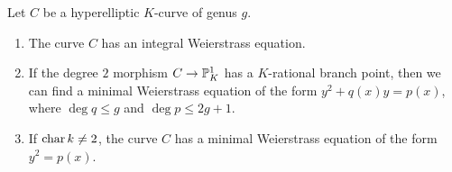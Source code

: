 \begin{prop}\label{algo}
 Let $C$ be a hyperelliptic $K$-curve of genus $g$. 
 \begin{enumerate}[\upshape(a)]
  \item The curve $C$ has an integral Weierstrass equation.  
  \item If the degree $2$ morphism $C \rightarrow \P^1_K$ has a $K$-rational branch point, then we can find a minimal Weierstrass equation of the form $y^2+q(x)y=p(x)$, where $\deg q \leq g$ and $\deg p \leq 2g+1$. 
  \item If $\cha k \neq 2$, the curve $C$ has a minimal Weierstrass equation of the form $y^2=p(x)$.
 \end{enumerate} 
\end{prop}
